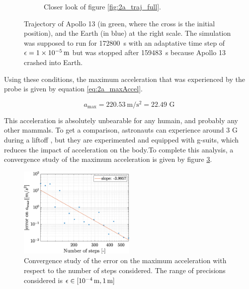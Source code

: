 \documentclass[a4paper,12pt,twoside]{article}
\begin{document}
\begin{figure}[h]
\begin{subfigure}[t]{0.45\textwidth}
    \caption{Closer look of figure \ref{fig:2a_traj_full}.}
    \label{fig:fig:2a_traj_close}
  \end{subfigure}
  \caption{Trajectory of Apollo 13 (in green, where the cross is the initial position), and the Earth (in blue) at the right scale. The simulation was supposed to run for \SI{172800}{\s} with an adaptative time step of $\epsilon=\SI{1d-5}{\m}$ but was stopped after \SI{159483}{\s} because Apollo 13 crashed into Earth.}
  \label{fig:2a_traj}
\end{figure}


Using these conditions, the maximum acceleration that was experienced by the probe is given by equation \eqref{eq:2a_maxAccel}.

\begin{equation}
  a_\text{max} = \SI{220.53}{\meter\per\square\second} = \num{22.49}\text{ G}
  \label{eq:2a_maxAccel}
\end{equation}

This acceleration is absolutely unbearable for any humain, and probably any other mammals.
To get a comparison, astronauts can experience around $\num{3}\text{ G}$ during a liftoff \cite{nasa:ask_the_crew}, but they are experimented and equipped with g-suits, which reduces the impact of acceleration \cite{wiki:g-suit} on the body.To complete this analysis, a convergence study of the maximum acceleration is given by figure \ref{fig:2a_conv}.\\

\begin{figure}[h]
  \centering
  \includegraphics[width=0.5\textwidth]{graphs/ex2a_conv.eps}
  \caption{Convergence study of the error on the maximum acceleration with respect to the number of steps considered. The range of precisions considered is $\epsilon \in [\SI{d-4}{\m}, \SI{1}{\m}]$}
  \label{fig:2a_conv}
\end{figure}
\end{document}
